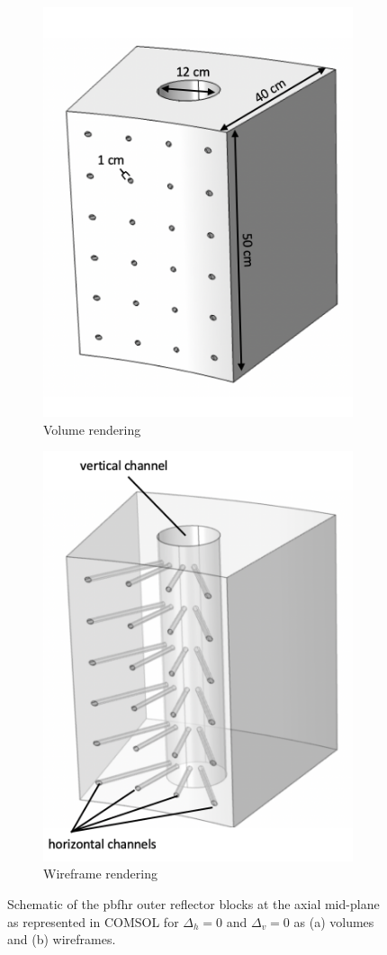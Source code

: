 \begin{figure}[h!]
    \begin{subfigure}{0.5\linewidth}
        \centering
        \includegraphics[width=0.6\linewidth]{figs/pbfhr_or2.png}
       \caption{Volume rendering}
    \end{subfigure}
    \begin{subfigure}{0.5\linewidth}
        \centering
        \includegraphics[width=0.6\linewidth]{figs/pbfhr_or1.png}
        \caption{Wireframe rendering}
    \end{subfigure}
    \caption{Schematic of the \gls{pbfhr} outer reflector blocks at the axial mid-plane as represented in COMSOL for \(\Delta_h=0\) and \(\Delta_v=0\) as (a) volumes and (b) wireframes.}
    \label{fig:ord}
\end{figure}

